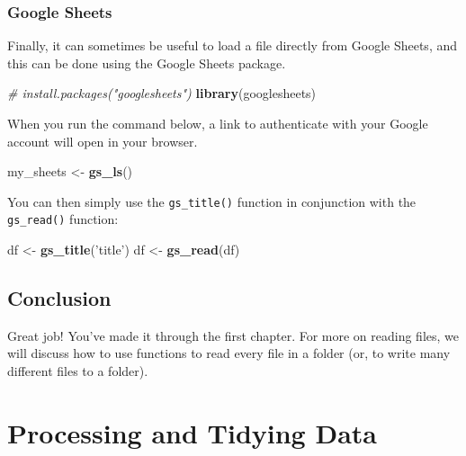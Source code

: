 \documentclass[]{book}
\newenvironment{Shaded}{\begin{snugshade}}{\end{snugshade}}
\newcommand{\KeywordTok}[1]{\textcolor[rgb]{0.13,0.29,0.53}{\textbf{#1}}}
\newcommand{\StringTok}[1]{\textcolor[rgb]{0.31,0.60,0.02}{#1}}
\newcommand{\CommentTok}[1]{\textcolor[rgb]{0.56,0.35,0.01}{\textit{#1}}}
\newcommand{\NormalTok}[1]{#1}
\theoremstyle{definition}
\theoremstyle{definition}
\theoremstyle{remark}
\begin{document}
\subsection{Google Sheets}\label{google-sheets}

Finally, it can sometimes be useful to load a file directly from Google
Sheets, and this can be done using the Google Sheets package.

\begin{Shaded}
\begin{Highlighting}[]
\CommentTok{# install.packages("googlesheets")}
\KeywordTok{library}\NormalTok{(googlesheets)}
\end{Highlighting}
\end{Shaded}

When you run the command below, a link to authenticate with your Google
account will open in your browser.

\begin{Shaded}
\begin{Highlighting}[]
\NormalTok{my_sheets <-}\StringTok{ }\KeywordTok{gs_ls}\NormalTok{()}
\end{Highlighting}
\end{Shaded}

You can then simply use the \texttt{gs\_title()} function in conjunction
with the \texttt{gs\_read()} function:

\begin{Shaded}
\begin{Highlighting}[]
\NormalTok{df <-}\StringTok{ }\KeywordTok{gs_title}\NormalTok{(}\StringTok{'title'}\NormalTok{)}
\NormalTok{df <-}\StringTok{ }\KeywordTok{gs_read}\NormalTok{(df)}
\end{Highlighting}
\end{Shaded}

\section{Conclusion}\label{conclusion}

Great job! You've made it through the first chapter. For more on reading
files, we will discuss how to use functions to read every file in a
folder (or, to write many different files to a folder).

\chapter{Processing and Tidying Data}\label{processing-and-tidying-data}
\end{document}
